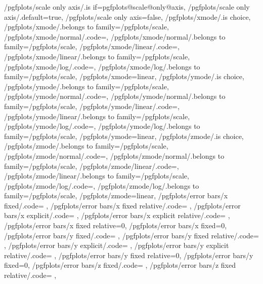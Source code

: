 {	/pgfplots/scale only axis/.is if=pgfplots@scale@only@axis,
	/pgfplots/scale only axis/.default=true,
	/pgfplots/scale only axis=false,
	/pgfplots/xmode/.is choice,
	/pgfplots/xmode/.belongs to family=/pgfplots/scale,
	/pgfplots/xmode/normal/.code={\pgfplots@xislineartrue},
	/pgfplots/xmode/normal/.belongs to family=/pgfplots/scale,
	/pgfplots/xmode/linear/.code={\pgfplots@xislineartrue},
	/pgfplots/xmode/linear/.belongs to family=/pgfplots/scale,
	/pgfplots/xmode/log/.code={\pgfplots@xislinearfalse},
	/pgfplots/xmode/log/.belongs to family=/pgfplots/scale,
	/pgfplots/xmode=linear,
	/pgfplots/ymode/.is choice,
	/pgfplots/ymode/.belongs to family=/pgfplots/scale,
	/pgfplots/ymode/normal/.code={\pgfplots@yislineartrue},
	/pgfplots/ymode/normal/.belongs to family=/pgfplots/scale,
	/pgfplots/ymode/linear/.code={\pgfplots@yislineartrue},
	/pgfplots/ymode/linear/.belongs to family=/pgfplots/scale,
	/pgfplots/ymode/log/.code={\pgfplots@yislinearfalse},
	/pgfplots/ymode/log/.belongs to family=/pgfplots/scale,
	/pgfplots/ymode=linear,
	/pgfplots/zmode/.is choice,
	/pgfplots/zmode/.belongs to family=/pgfplots/scale,
	/pgfplots/zmode/normal/.code={\pgfplots@zislineartrue},
	/pgfplots/zmode/normal/.belongs to family=/pgfplots/scale,
	/pgfplots/zmode/linear/.code={\pgfplots@zislineartrue},
	/pgfplots/zmode/linear/.belongs to family=/pgfplots/scale,
	/pgfplots/zmode/log/.code={\pgfplots@zislinearfalse},
	/pgfplots/zmode/log/.belongs to family=/pgfplots/scale,
	/pgfplots/zmode=linear,
	/pgfplots/error bars/x fixed/.code=				\def\pgfplots@errorbars@xfixed{#1}\def\pgfplots@errorbars@xmode{0},
	/pgfplots/error bars/x fixed relative/.code=		\def\pgfplots@errorbars@xrel{#1}\def\pgfplots@errorbars@xmode{1},
	/pgfplots/error bars/x explicit/.code=			\def\pgfplots@errorbars@xmode{2},
	/pgfplots/error bars/x explicit relative/.code=	\def\pgfplots@errorbars@xmode{3},
	/pgfplots/error bars/x fixed relative=0,
	/pgfplots/error bars/x fixed=0,
	/pgfplots/error bars/y fixed/.code=				\def\pgfplots@errorbars@yfixed{#1}\def\pgfplots@errorbars@ymode{0},
	/pgfplots/error bars/y fixed relative/.code=		\def\pgfplots@errorbars@yrel{#1}\def\pgfplots@errorbars@ymode{1},
	/pgfplots/error bars/y explicit/.code=			\def\pgfplots@errorbars@ymode{2},
	/pgfplots/error bars/y explicit relative/.code=	\def\pgfplots@errorbars@ymode{3},
	/pgfplots/error bars/y fixed relative=0,
	/pgfplots/error bars/y fixed=0,
	/pgfplots/error bars/z fixed/.code=				\def\pgfplots@errorbars@zfixed{#1}\def\pgfplots@errorbars@zmode{0},
	/pgfplots/error bars/z fixed relative/.code=		\def\pgfplots@errorbars@zrel{#1}\def\pgfplots@errorbars@zmode{1},
}
